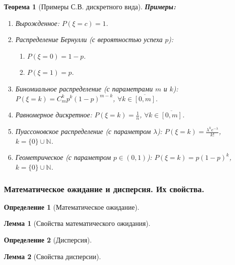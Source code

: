\documentclass[14pt]{extarticle}
\theoremstyle{breakstyle}
\newtheorem{definition}{Определение}[subsection]
\newtheorem{theorem}{Теорема}[subsection]
\newtheorem{lemma}{Лемма}[subsection]
\begin{document}
\begin{theorem}[Примеры С.В. дискретного вида]

\textbf{Примеры:}
\begin{enumerate}
    \item Вырожденное: $P(\xi = c) = 1$.

    \item Распределение Бернулли (с вероятностью успеха $p$): \\
          \begin{enumerate}
              \item $P(\xi = 0) = 1 - p$.
              \item $P(\xi = 1) = p$.
          \end{enumerate}

    \item Биномиальное распределение (с параметрами $m$ и $k$): $P(\xi = k) = C_{m}^{k}p^{k}(1-p)^{m - k}$, $\forall k \in \overline{[0, m]}$.
    \item Равномерное дискретное: $P(\xi = k) = \frac{1}{n}$, $\forall k \in \overline{[0, m]}$.
    \item Пуассоновское распределение (с параметром $\lambda$): $P(\xi = k) = \frac{\lambda^{k}e^{-\lambda}}{k!}$, $k = \{0\} \cup \mathbb{N}$.
    \item Геометрическое (с параметром $p \in (0, 1)$): $P(\xi = k) = p (1-p)^{k}$, $k = \{0\} \cup \mathbb{N}$.
          
\end{enumerate}

\end{theorem}

\subsubsection{Математическое ожидание и дисперсия. Их свойства.}
\begin{definition}[Математическое ожидание]

\end{definition}

\begin{lemma}[Свойства математического ожидания]

\end{lemma}

\begin{definition}[Дисперсия]

\end{definition}

\begin{lemma}[Свойства дисперсии]

\end{lemma}
\end{document}
